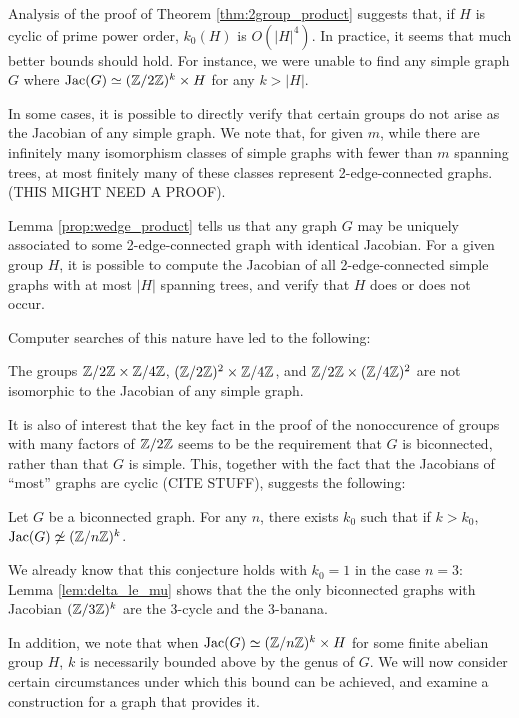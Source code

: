 \documentclass{amsart}
\begin{document}
Analysis of the proof of Theorem \ref{thm:2group_product} suggests
that, if $H$ is cyclic of prime power order, $k_0(H)$ is
$O(|H|^4)$. In practice, it seems that much better bounds should
hold. For instance, we were unable to find any simple graph $G$ where
$\operatorname{Jac}(G) \simeq (\mathbb{Z}/2\mathbb{Z})^k \times H$ for any $k > |H|$.

In some cases, it is possible to directly verify that certain groups
do not arise as the Jacobian of any simple graph. We note that, for
given $m$, while there are infinitely many isomorphism classes of
simple graphs with fewer than $m$ spanning trees, at most finitely
many of these classes represent 2-edge-connected graphs. (THIS MIGHT
NEED A PROOF).

Lemma \ref{prop:wedge_product} tells us that any graph $G$ may be
uniquely associated to some 2-edge-connected graph with identical
Jacobian. For a given group $H$, it is possible to compute the
Jacobian of all 2-edge-connected simple graphs with at most $|H|$
spanning trees, and verify that $H$ does or does not occur. 

Computer searches of this nature have led to the following:

\begin{thm}
  The groups $\mathbb{Z}/2\mathbb{Z} \times \mathbb{Z}/4\mathbb{Z}$, $(\mathbb{Z}/2\mathbb{Z})^2 \times \mathbb{Z}/4\mathbb{Z}$, and
  $\mathbb{Z}/2\mathbb{Z} \times (\mathbb{Z}/4\mathbb{Z})^2$ are not isomorphic to the Jacobian of any
  simple graph.
\end{thm}

It is also of interest that the key fact in the proof of the
nonoccurence of groups with many factors of $\mathbb{Z}/2\mathbb{Z}$ seems to be the
requirement that $G$ is biconnected, rather than that $G$ is
simple. This, together with the fact that the Jacobians of ``most''
graphs are cyclic (CITE STUFF), suggests the following:

\begin{conj}
  Let $G$ be a biconnected graph. For any $n$, there exists $k_0$ such
  that if $k > k_0$, $\operatorname{Jac}(G) \not\simeq (\mathbb{Z}/n\mathbb{Z})^k$.
\end{conj}

We already know that this conjecture holds with $k_0 = 1$ in the case
$n=3$: Lemma \ref{lem:delta_le_mu} shows that the the only biconnected
graphs with Jacobian $(\mathbb{Z}/3\mathbb{Z})^k$ are the $3$-cycle and the
$3$-banana.

In addition, we note that when $\operatorname{Jac}(G) \simeq (\mathbb{Z}/n\mathbb{Z})^k \times H$
for some finite abelian group $H$, $k$ is necessarily bounded above by
the genus of $G$. We will now consider certain circumstances under
which this bound can be achieved, and examine a construction for a
graph that provides it.
\end{document}
